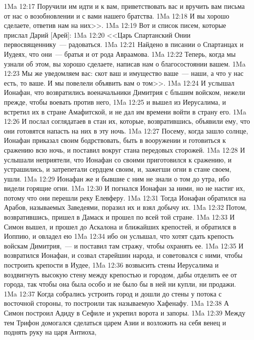 \vs 1Ma 12:17 Поручили им идти и к вам, приветствовать вас и вручить вам письма от нас о возобновлении и с вами нашего братства.
\vs 1Ma 12:18 И вы хорошо сделаете, ответив нам на них>>.
\rsbpar\vs 1Ma 12:19 Вот и список писем, которые прислал Дарий [Арей]:
\vs 1Ma 12:20 <<Царь Спартанский Онии первосвященнику~--- радоваться.
\vs 1Ma 12:21 Найдено в писании о Спартанцах и Иудеях, что они~--- братья и от рода Авраамова.
\vs 1Ma 12:22 Теперь, когда мы узнали об этом, вы хорошо сделаете, написав нам о благосостоянии вашем.
\vs 1Ma 12:23 Мы же уведомляем вас: скот ваш и имущество ваше~--- наши, а что у нас есть, то ваше. И мы повелели объявить вам о том>>.
\rsbpar\vs 1Ma 12:24 И услышал Ионафан, что возвратились военачальники Димитрия с бльшим войском, нежели прежде, чтобы воевать против него,
\vs 1Ma 12:25 и вышел из Иерусалима, и встретил их в стране Амафитской, и не дал им времени войти в страну его.
\vs 1Ma 12:26 И послал соглядатаев в стан их, которые, возвратившись, объявили ему, что они готовятся напасть на них в эту ночь.
\vs 1Ma 12:27 Посему, когда зашло солнце, Ионафан приказал своим бодрствовать, быть в вооружении и готовиться к сражению всю ночь, и поставил вокруг стана передовых сторожей.
\vs 1Ma 12:28 И услышали неприятели, что Ионафан со своими приготовился к сражению, и устрашились, и затрепетали сердцем своим, и, зажегши огни в стане своем, ушли.
\vs 1Ma 12:29 Ионафан же и бывшие с ним не знали о том до утра, ибо видели горящие огни.
\vs 1Ma 12:30 И погнался Ионафан за ними, но не настиг их, потому что они перешли реку Елевферу.
\vs 1Ma 12:31 Тогда Ионафан обратился на Арабов, называемых Заведеями, поразил их и взял добычу их.
\vs 1Ma 12:32 Потом, возвратившись, пришел в Дамаск и прошел по всей той стране.
\vs 1Ma 12:33 И Симон вышел, и прошел до Аскалона и ближайших крепостей, и обратился в Иоппию, и овладел ею
\vs 1Ma 12:34 ибо он услышал, что  хотят сдать крепость войскам Димитрия,~--- и поставил там стражу, чтобы охранять ее.
\vs 1Ma 12:35 И возвратился Ионафан, и созвал старейшин народа, и советовался с ними, чтобы построить крепости в Иудее,
\vs 1Ma 12:36 возвысить стены Иерусалима и воздвигнуть высокую стену между крепостью и городом, дабы отделить ее от города, так чтобы она была особо и не было бы в ней ни купли, ни продажи.
\vs 1Ma 12:37 Когда собрались устроить город и дошли до стены у потока с восточной стороны, то построили так называемую Хафенафу.
\vs 1Ma 12:38 А Симон построил Адиду в Сефиле и укрепил ворота и запоры.
\rsbpar\vs 1Ma 12:39 Между тем Трифон домогался сделаться царем Азии и возложить на себя венец и поднять руку на царя Антиоха,
